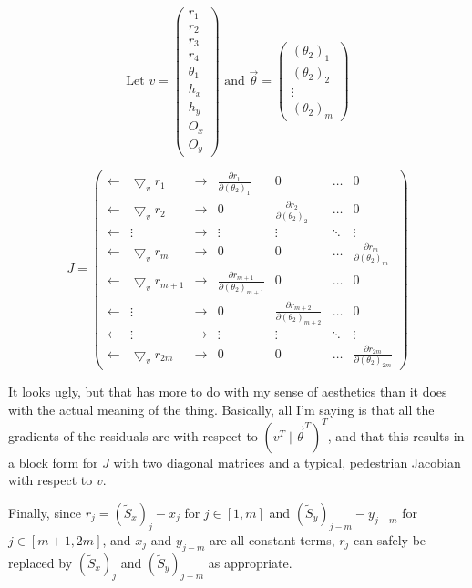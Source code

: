 \documentclass[12pt, letterpaper]{article}
\begin{document}
\[\text{Let } v=\begin{pmatrix}r_1\\r_2\\r_3\\r_4\\\theta_1\\h_x\\h_y\\O_x\\O_y\end{pmatrix} \text{ and } \vec{\theta}=\begin{pmatrix}(\theta_2)_1 \\ (\theta_2)_2 \\ \vdots \\ (\theta_2)_m\end{pmatrix}\]

\[J=\begin{pmatrix}
\leftarrow & \bigtriangledown_vr_1 & \rightarrow & \frac{\partial r_1}{\partial(\theta_2)_1} & 0 & \dots & 0\\
\leftarrow & \bigtriangledown_vr_2 & \rightarrow & 0 & \frac{\partial r_2}{\partial(\theta_2)_2} & \dots & 0\\
\leftarrow & \vdots & \rightarrow & \vdots & \vdots & \ddots & \vdots\\
\leftarrow & \bigtriangledown_vr_m & \rightarrow & 0 & 0 & \dots & \frac{\partial r_m}{\partial(\theta_2)_m}\\
\leftarrow & \bigtriangledown_vr_{m+1} & \rightarrow& \frac{\partial r_{m+1}}{\partial (\theta_2)_{m+1}} & 0 & \dots & 0\\
\leftarrow & \vdots & \rightarrow & 0 & \frac{\partial r_{m+2}}{\partial (\theta_2)_{m+2}} & \dots & 0\\
\leftarrow & \vdots & \rightarrow & \vdots & \vdots & \ddots & \vdots\\
\leftarrow & \bigtriangledown_vr_{2m} & \rightarrow & 0 & 0 & \dots & \frac{\partial r_{2m}}{\partial(\theta_2)_{2m}}
\end{pmatrix}\]

It looks ugly, but that has more to do with my sense of aesthetics than it does with the actual meaning of the thing. Basically, all I'm saying is that all the gradients of the residuals are with respect to \((v^T \; | \; \vec{\theta}^T)^T\), and that this results in a block form for \(J\) with two diagonal matrices and a typical, pedestrian Jacobian with respect to \(v\).

Finally, since \(r_j=(\tilde{S}_x)_j-x_j\) for \(j \in [1,m]\) and \((\tilde{S}_y)_{j-m}-y_{j-m}\) for \(j \in [m+1,2m]\), and \(x_j\) and \(y_{j-m}\) are all constant terms, \(r_j\) can safely be replaced by \((\tilde{S}_x)_j\) and \((\tilde{S}_y)_{j-m}\) as appropriate.
\end{document}
